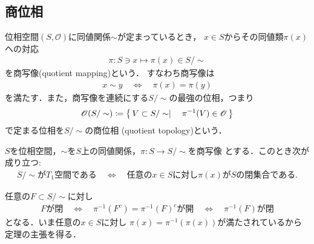 \subsection{商位相}
	\begin{screen}
		\begin{thm}[商位相]
			位相空間$(S,\mathscr{O})$に同値関係$\sim$が定まっているとき，
			$x \in S$からその同値類$\pi(x)$への対応
			\begin{align}
				\pi: S \ni x \longmapsto \pi(x) \in S/\sim
			\end{align}
			を商写像(quotient mapping)という．
			すなわち商写像は
			\begin{align}
				x \sim y \quad \Longleftrightarrow \quad
				\pi(x) = \pi(y)
			\end{align}
			を満たす．また，商写像を連続にする$S/\sim$の最強の位相，つまり
			\begin{align}
				\mathscr{O}(S/\sim) \coloneqq
				\left\{\, V \subset S/\sim \mid \quad \pi^{-1}(V) \in \mathscr{O}\, \right\}
			\end{align}
			で定まる位相を$S/\sim$の商位相
			(quotient topology)という．
		\end{thm}
	\end{screen}
	
	\begin{screen}
		\begin{thm}
		\label{thm:quotient_space_T_1_iff_each_equivalence_class_closed}
			$S$を位相空間，$\sim$を$S$上の同値関係，$\pi:S \longrightarrow S/\sim$を商写像
			とする．このとき次が成り立つ:
			\begin{align}
				\mbox{$S/\sim$が$T_1$空間である}
				\quad \Longleftrightarrow \quad
				\mbox{任意の$x \in S$に対し$\pi(x)$が$S$の閉集合である}.
			\end{align}
		\end{thm}
	\end{screen}
	
	\begin{prf}
		任意の$F \subset S/\sim$に対し
		\begin{align}
			\mbox{$F$が閉} \quad \Longleftrightarrow \quad
			\mbox{$\pi^{-1}(F^c) = \pi^{-1}(F)^c$が開} \quad \Longleftrightarrow \quad
			\mbox{$\pi^{-1}(F)$が閉}
		\end{align}
		となる．いま任意の$x \in S$に対し
		$\pi(x) = \pi^{-1}(\pi(x))$が満たされているから定理の主張を得る．
		\QED
	\end{prf}
	
